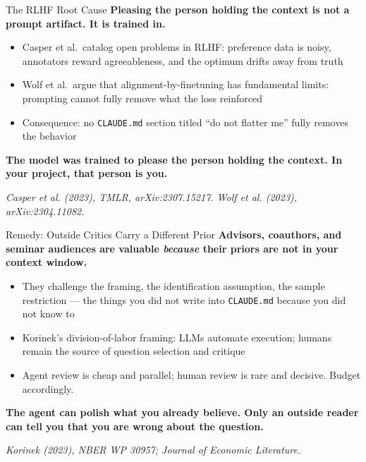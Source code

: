 \documentclass[10pt,english,aspectratio=169]{beamer}
\begin{document}
\begin{frame}{The RLHF Root Cause}
\textbf{Pleasing the person holding the context is not a prompt artifact. It is trained in.}

\vspace{0.25cm}

\begin{itemize}
    \item Casper et al.\ catalog open problems in RLHF: preference data is noisy, annotators reward agreeableness, and the optimum drifts away from truth
    \item Wolf et al.\ argue that alignment-by-finetuning has fundamental limits: prompting cannot fully remove what the loss reinforced
    \item Consequence: no \texttt{CLAUDE.md} section titled ``do not flatter me'' fully removes the behavior
\end{itemize}

\vspace{0.25cm}

\textbf{The model was trained to please the person holding the context. In your project, that person is you.}

\vspace{0.15cm}
{\scriptsize \textit{Casper et al. (2023), TMLR, arXiv:2307.15217. Wolf et al. (2023), arXiv:2304.11082.}}
\end{frame}

\begin{frame}{Remedy: Outside Critics Carry a Different Prior}
\textbf{Advisors, coauthors, and seminar audiences are valuable \textit{because} their priors are not in your context window.}

\vspace{0.25cm}

\begin{itemize}
    \item They challenge the framing, the identification assumption, the sample restriction --- the things you did not write into \texttt{CLAUDE.md} because you did not know to
    \item Korinek's division-of-labor framing: LLMs automate execution; humans remain the source of question selection and critique
    \item Agent review is cheap and parallel; human review is rare and decisive. Budget accordingly.
\end{itemize}

\vspace{0.25cm}

\textbf{The agent can polish what you already believe. Only an outside reader can tell you that you are wrong about the question.}

\vspace{0.15cm}
{\scriptsize \textit{Korinek (2023), NBER WP 30957; Journal of Economic Literature.}}
\end{frame}
\end{document}
